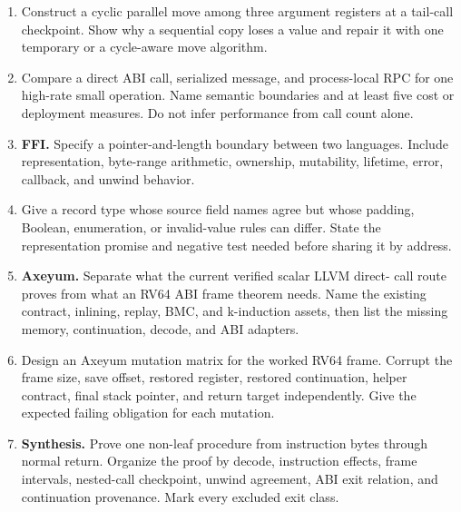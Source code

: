 \begin{enumerate}
\item Construct a cyclic parallel move among three argument registers at a
tail-call checkpoint. Show why a sequential copy loses a value and repair it
with one temporary or a cycle-aware move algorithm.

\item Compare a direct ABI call, serialized message, and process-local RPC for
one high-rate small operation. Name semantic boundaries and at least five cost
or deployment measures. Do not infer performance from call count alone.

\item \textbf{FFI.} Specify a pointer-and-length boundary between two
languages. Include representation, byte-range arithmetic, ownership,
mutability, lifetime, error, callback, and unwind behavior.

\item Give a record type whose source field names agree but whose padding,
Boolean, enumeration, or invalid-value rules can differ. State the
representation promise and negative test needed before sharing it by address.

\item \textbf{Axeyum.} Separate what the current verified scalar LLVM direct-
call route proves from what an RV64 ABI frame theorem needs. Name the existing
contract, inlining, replay, BMC, and k-induction assets, then list the missing
memory, continuation, decode, and ABI adapters.

\item Design an Axeyum mutation matrix for the worked RV64 frame. Corrupt the
frame size, save offset, restored register, restored continuation, helper
contract, final stack pointer, and return target independently. Give the
expected failing obligation for each mutation.

\item \textbf{Synthesis.} Prove one non-leaf procedure from instruction bytes
through normal return. Organize the proof by decode, instruction effects,
frame intervals, nested-call checkpoint, unwind agreement, ABI exit relation,
and continuation provenance. Mark every excluded exit class.
\end{enumerate}
